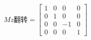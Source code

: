 $$
Mz翻转=
\begin{bmatrix}
  1 & 0 & 0 & 0 \\
  0 & 1 & 0 & 0 \\
  0 & 0 & -1 & 0 \\
  0 & 0 & 0 & 1
\end{bmatrix}
$$